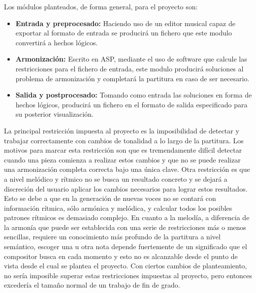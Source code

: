  Los módulos planteados, de forma general, para el proyecto son:
 \begin{itemize}
 	\item \textbf{Entrada y preprocesado:} Haciendo uso de un editor musical capaz de exportar al formato de entrada se producirá un fichero que este modulo convertirá a hechos lógicos.
 	\item \textbf{Armonización:} Escrito en ASP, mediante el uso de software que calcule las restricciones para el fichero de entrada, este modulo producirá soluciones al problema de armonización y completará la partitura en caso de ser necesario.
 	\item \textbf{Salida y postprocesado:} Tomando como entrada las soluciones en forma de hechos lógicos, producirá un fichero en el formato de salida especificado para su posterior visualización.
 \end{itemize}
 
 La principal restricción impuesta al proyecto es la imposibilidad de detectar y trabajar correctamente con cambios de tonalidad a lo largo de la partitura. Los motivos para marcar esta restricción son que es tremendamente difícil detectar cuando una pieza comienza a realizar estos cambios y que no se puede realizar una armonización completa correcta bajo una única clave. Otra restricción es que a nivel melódico y rítmico no se busca un resultado concreto y se dejará a discreción del usuario aplicar los cambios necesarios para lograr estos resultados. Esto se debe a que en la generación de nuevas voces no se contará con información rítmica, sólo armónica y melódica, y calcular todos los posibles patrones rítmicos es demasiado complejo. En cuanto a la melodía, a diferencia de la armonía que puede ser establecida con una serie de restricciones más o menos sencillas, requiere un conocimiento más profundo de la partitura a nivel semántico, escoger una u otra nota depende fuertemente de un significado que el compositor busca en cada momento y esto no es alcanzable desde el punto de vista desde el cual se plantea el proyecto. Con ciertos cambios de planteamiento, no sería imposible superar estas restricciones impuestas al proyecto, pero entonces excedería el tamaño normal de un trabajo de fin de grado.
 
 
